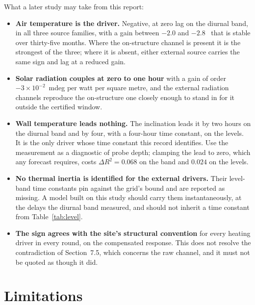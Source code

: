 \documentclass[11pt,a4paper]{article}
\begin{document}
What a later study may take from this report:

\begin{itemize}
\item \textbf{Air temperature is the driver.} Negative, at zero lag on the
diurnal band, in all three source families, with a gain between $-2.0$ and
$-2.8$~\mdegC{} that is stable over thirty-five months. Where the
on-structure channel is present it is the strongest of the three; where it is
absent, either external source carries the same sign and lag at a reduced gain.

\item \textbf{Solar radiation couples at zero to one hour} with a gain of order
$-3\times10^{-2}$~mdeg per watt per square metre, and the external radiation
channels reproduce the on-structure one closely enough to stand in for it
outside the certified window.

\item \textbf{Wall temperature leads nothing.} The inclination leads it by two
hours on the diurnal band and by four, with a four-hour time constant, on the
levels. It is the only driver whose time constant this record identifies. Use
the measurement as a diagnostic of probe depth; clamping the lead to zero, which
any forecast requires, costs $\Delta R^2 = 0.068$ on the band and $0.024$ on the
levels.

\item \textbf{No thermal inertia is identified for the external drivers.} Their
level-band time constants pin against the grid's bound and are reported as
missing. A model built on this study should carry them instantaneously, at the
delays the diurnal band measured, and should not inherit a time constant from
Table~\ref{tab:level}.

\item \textbf{The sign agrees with the site's structural convention} for every
heating driver in every round, on the compensated response. This does not
resolve the contradiction of Section~7.5, which concerns the raw channel, and it
must not be quoted as though it did.
\end{itemize}

\section{Limitations}
\label{sec:limitations}
\end{document}
